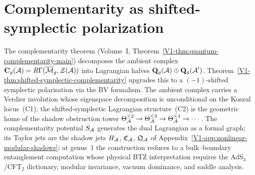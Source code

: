 
\providecommand{\MC}{\mathrm{MC}}
\providecommand{\Defcyc}{\mathrm{Def}_{\mathrm{cyc}}}
\providecommand{\Definfmod}{\mathrm{Def}^{\mathrm{mod}}_\infty}
\providecommand{\Sh}{\mathrm{Sh}}
\providecommand{\gr}{\operatorname{gr}}
\providecommand{\id}{\mathrm{id}}
\providecommand{\Tr}{\operatorname{Tr}}
\providecommand{\Sym}{\operatorname{Sym}}
\providecommand{\Hom}{\operatorname{Hom}}
\providecommand{\End}{\operatorname{End}}
\providecommand{\Spec}{\operatorname{Spec}}
\providecommand{\Res}{\operatorname{Res}}
\providecommand{\rank}{\operatorname{rank}}
\providecommand{\ad}{\operatorname{ad}}
\providecommand{\Fred}{\operatorname{Fred}}
\providecommand{\Map}{\operatorname{Map}}
\providecommand{\RGamma}{R\Gamma}
\providecommand{\Perf}{\operatorname{Perf}}
\providecommand{\BTZ}{\mathrm{BTZ}}

\section{Complementarity as shifted-symplectic polarization}
\label{ch:thqg-symplectic-polarization}%

The complementarity theorem (Volume~I, Theorem~\ref{V1-thm:quantum-complementarity-main})
decomposes the ambient complex
$\mathbf{C}_g(\cA) = \RGamma(\overline{\mathcal{M}}_g,
\mathcal{Z}(\cA))$ into Lagrangian halves
$\mathbf{Q}_g(\mathcal{A}) \oplus \mathbf{Q}_g(\mathcal{A}^!)$.
Theorem~\ref{V1-thm:shifted-symplectic-complementarity} upgrades
this to a $(-1)$-shifted symplectic polarisation via the BV
formalism. The ambient complex carries a Verdier involution whose
eigenspace decomposition is unconditional on the Koszul
locus~(C1); the shifted-symplectic Lagrangian structure~(C2) is
the geometric home of the shadow obstruction tower
$\Theta_{\mathcal{A}}^{\le 2} \to \Theta_{\mathcal{A}}^{\le 3} \to \Theta_{\mathcal{A}}^{\le 4}
\to \cdots$. The complementarity potential $S_{\mathcal{A}}$ generates the
dual Lagrangian as a formal graph; its Taylor jets are the shadow
jets $H_{\mathcal{A}}$, $\mathfrak{C}_{\mathcal{A}}$, $\mathfrak{Q}_{\mathcal{A}}$ of
Appendix~\ref*{V1-app:nonlinear-modular-shadows}; at genus~$1$
the construction reduces to a bulk--boundary entanglement
computation whose physical BTZ interpretation requires the
AdS$_3$/CFT$_2$ dictionary, modular invariance, vacuum dominance,
and saddle analysis.

